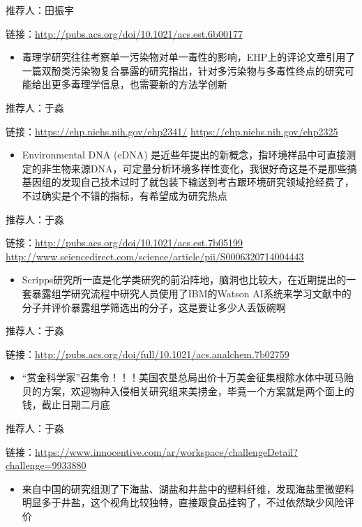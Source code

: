 \documentclass[]{book}
\providecommand{\tightlist}{%
  \setlength{\itemsep}{0pt}\setlength{\parskip}{0pt}}
\begin{document}
推荐人：田振宇

链接：\url{http://pubs.acs.org/doi/10.1021/acs.est.6b00177}

\begin{itemize}
\tightlist
\item
  毒理学研究往往考察单一污染物对单一毒性的影响，EHP上的评论文章引用了一篇双酚类污染物复合暴露的研究指出，针对多污染物与多毒性终点的研究可能给出更多毒理学信息，也需要新的方法学创新
\end{itemize}

推荐人：于淼

链接：\url{https://ehp.niehs.nih.gov/ehp2341/}
\url{https://ehp.niehs.nih.gov/ehp2325}

\begin{itemize}
\tightlist
\item
  Environmental DNA (eDNA)
  是近些年提出的新概念，指环境样品中可直接测定的非生物来源DNA，可定量分析环境多样性变化，我很好奇这是不是那些搞基因组的发现自己技术过时了就包装下输送到考古跟环境研究领域抢经费了，不过确实是个不错的指标，有希望成为研究热点
\end{itemize}

推荐人：于淼

链接：\url{http://pubs.acs.org/doi/10.1021/acs.est.7b05199}
\url{http://www.sciencedirect.com/science/article/pii/S0006320714004443}

\begin{itemize}
\tightlist
\item
  Scripps研究所一直是化学类研究的前沿阵地，脑洞也比较大，在近期提出的一套暴露组学研究流程中研究人员使用了IBM的Watson
  AI系统来学习文献中的分子并评价暴露组学筛选出的分子，这是要让多少人丢饭碗啊
\end{itemize}

推荐人：于淼

链接：\url{http://pubs.acs.org/doi/full/10.1021/acs.analchem.7b02759}

\begin{itemize}
\tightlist
\item
  ``赏金科学家''召集令！！！美国农垦总局出价十万美金征集根除水体中斑马贻贝的方案，欢迎物种入侵相关研究组来美捞金，毕竟一个方案就是两个面上的钱，截止日期二月底
\end{itemize}

推荐人：于淼

链接：\url{https://www.innocentive.com/ar/workspace/challengeDetail?challenge=9933880}

\begin{itemize}
\tightlist
\item
  来自中国的研究组测了下海盐、湖盐和井盐中的塑料纤维，发现海盐里微塑料明显多于井盐，这个视角比较独特，直接跟食品挂钩了，不过依然缺少风险评价
\end{itemize}
\end{document}
